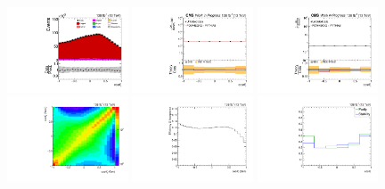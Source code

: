 \begin{refsection}
\begin{figure}[htb]
\begin{center}
 \includegraphics[width=0.32\textwidth]{fig_fullRun2UL/controlplots/combined/Hyp_AntiLeptonBr.pdf}
 \includegraphics[width=0.32\textwidth]{fig_fullRun2UL/unfolding/combined/UnfoldedResults_b1r.pdf}
 \includegraphics[width=0.32\textwidth]{fig_fullRun2UL/unfolding/combined/UnfoldedResultsNorm_b1r.pdf} \\
 \includegraphics[width=0.32\textwidth]{fig_fullRun2UL/unfolding/combined/ResponseMatrix_b1r.pdf}
 \includegraphics[width=0.32\textwidth]{fig_fullRun2UL/unfolding/combined/TotEff_b1r.pdf}
 \includegraphics[width=0.32\textwidth]{fig_fullRun2UL/unfolding/combined/PurStab_b1r.pdf} \\

\end{center}
\end{figure}
\end{refsection}
